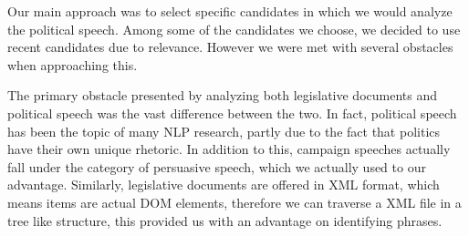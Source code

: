 \documentclass[12pt]{article}
\begin{document}
\par{Our main approach was to select specific candidates in which we would analyze the political speech. Among some of the candidates we choose, we decided to use recent candidates due to relevance. However we were met with several obstacles when approaching this.} 
\par{The primary obstacle presented by analyzing both legislative documents and political speech was the vast difference between the two. In fact, political speech has been the topic of many NLP research, partly due to the fact that politics have their own unique rhetoric. In addition to this, campaign speeches actually fall under the category of persuasive speech, which we actually used to our advantage. Similarly, legislative documents are offered in XML format, which means items are actual DOM elements, therefore we can traverse a XML file in a tree like structure, this provided us with an advantage on identifying phrases.  }
\end{document}
